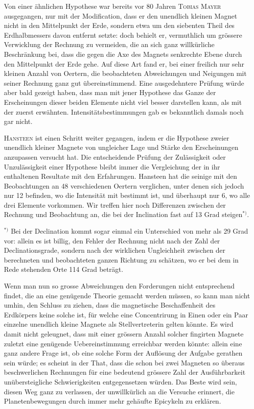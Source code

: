 \documentclass[fontsize=11pt,paper=a4,twoside,openany]{scrbook}
\begin{document}
Von einer ähnlichen Hypothese war bereits vor 80 Jahren \textsc{Tobias Mayer} ausgegangen, nur mit der Modification, dass er den unendlich kleinen Magnet nicht in den Mittelpunkt der Erde, sondern etwa um den siebenten Theil des Erdhalbmessers davon entfernt setzte: doch behielt er, vermuthlich um grössere Verwicklung der Rechnung zu vermeiden, die an sich ganz willkürliche Beschränkung bei, dass die gegen die Axe des Magnets senkrechte Ebene durch den Mittelpunkt der Erde gehe. Auf diese Art fand er, bei einer freilich nur sehr kleinen Anzahl von Oertern, die beobachteten Abweichungen und Neigungen mit seiner Rechnung ganz gut übereinstimmend. Eine ausgedehntere Prüfung würde aber bald gezeigt haben, dass man mit jener Hypothese das Ganze der Erscheinungen dieser beiden Elemente nicht viel besser darstellen kann, als mit der zuerst erwähnten. Intensitätsbestimmungen gab es bekanntlich damals noch gar nicht.

\textsc{Hansteen} ist einen Schritt weiter gegangen, indem er die Hypothese zweier unendlich kleiner Magnete von ungleicher Lage und Stärke den Erscheinungen anzupassen versucht hat. Die entscheidende Prüfung der Zulässigkeit oder Unzulässigkeit einer Hypothese bleibt immer die Vergleichung der in ihr enthaltenen Resultate mit den Erfahrungen. Hansteen hat die seinige mit den Beobachtungen an 48 verschiedenen Oertern verglichen, unter denen sich jedoch nur 12 befinden, wo die Intensität mit bestimmt ist, und überhaupt nur 6, wo alle drei Elemente vorkommen. Wir treffen hier noch Differenzen zwischen der Rechnung und Beobachtung an, die bei der Inclination fast auf 13 Grad steigen$^{*)}$.

$^{*)}$ Bei der Declination kommt sogar einmal ein Unterschied von mehr als 29 Grad vor: allein es ist billig, den Fehler der Rechnung nicht nach der Zahl der Declinationsgrade, sondern nach der wirklichen Ungleichheit zwischen der berechneten und beobachteten ganzen Richtung zu schätzen, wo er bei dem in Rede stehenden Orte 114 Grad beträgt.

Wenn man nun so grosse Abweichungen den Forderungen nicht entsprechend findet, die an eine genügende Theorie gemacht werden müssen, so kann man nicht umhin, den Schluss zu ziehen, dass die magnetische Beschaffenheit des Erdkörpers keine solche ist, für welche eine Concentrirung in Einen oder ein Paar einzelne unendlich kleine Magnete als Stellvertreterin gelten könnte. Es wird damit nicht geleugnet, dass mit einer grössern Anzahl solcher fingirten Magnete zuletzt eine genügende Uebereinstimmung erreichbar werden könnte: allein eine ganz andere Frage ist, ob eine solche Form der Auflösung der Aufgabe gerathen sein würde; es scheint in der That, dass die schon bei zwei Magneten so überaus beschwerlichen Rechnungen für eine bedeutend grössere Zahl der Ausführbarkeit unübersteigliche Schwierigkeiten entgegensetzen würden. Das Beste wird sein, diesen Weg ganz zu verlassen, der unwillkürlich an die Versuche erinnert, die Planetenbewegungen durch immer mehr gehäufte Epicykeln zu erklären.
\end{document}
